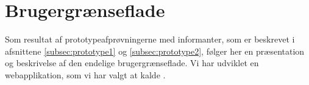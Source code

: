 \section{Brugergrænseflade}
\label{sec:webapplikationen}

Som resultat af prototypeafprøvningerne med informanter, som er beskrevet i afsnittene \ref{subsec:prototype1} og \ref{subsec:prototype2}, følger her en præsentation og beskrivelse af den endelige brugergrænseflade. Vi har udviklet en webapplikation, som vi har valgt at kalde \Foodl{}.







